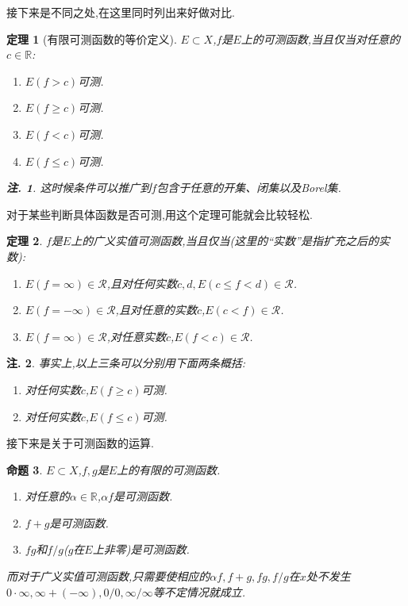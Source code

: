 \documentclass[12pt,a4paper,oneside]{ctexart}
\theoremstyle{nonumberplain}
\theoremstyle{plain}
\newtheorem{theorem}{定理}[section]
\theoremstyle{plain}
\theoremstyle{nonumberplain}
\newtheorem{remark}{注.}
\theoremstyle{plain}
\theoremstyle{plain}
\theoremstyle{plain}
\newtheorem{proposition}[theorem]{命题}
\theoremstyle{plain}
\newcommand{\R}{\mathbb{R}}
\newcommand{\cR}{\mathcal{R}}
\begin{document}
    接下来是不同之处,在这里同时列出来好做对比.
    \begin{theorem}[有限可测函数的等价定义]
        $E\subset X$,$f$是$E$上的可测函数,当且仅当对任意的$c\in \R$:
        \begin{enumerate}
            \item $E(f>c)$可测.
            \item $E(f\geqslant c)$可测.
            \item $E(f<c)$可测.
            \item $E(f\leqslant c)$可测.
        \end{enumerate}
        \begin{remark}
            这时候条件可以推广到$f$包含于任意的开集、闭集以及Borel集.
        \end{remark}
    \end{theorem}
    对于某些判断具体函数是否可测,用这个定理可能就会比较轻松.
    \begin{theorem}
        $f$是$E$上的广义实值可测函数,当且仅当(这里的``实数''是指扩充之后的实数):
        \begin{enumerate}
            \item $E(f=\infty)\in\cR$,且对任何实数$c,d,E(c\leqslant f<d)\in\cR$.
            \item $E(f=-\infty)\in\cR$,且对任意的实数$c$,$E(c<f)\in\cR$.
            \item $E(f=\infty)\in\cR$,对任意实数$c$,$E(f<c)\in\cR$.
        \end{enumerate}
    \end{theorem}
    \begin{remark}
        事实上,以上三条可以分别用下面两条概括:
        \begin{enumerate}
            \item 对任何实数$c$,$E(f\geqslant c)$可测.
            \item 对任何实数$c$,$E(f\leqslant c)$可测.
        \end{enumerate}
    \end{remark}
    接下来是关于可测函数的运算.
    \begin{proposition}
        $E\subset X$,$f,g$是$E$上的有限的可测函数.
        \begin{enumerate}
            \item 对任意的$\alpha\in\R$,$\alpha f$是可测函数.
            \item $f+g$是可测函数.
            \item $fg$和$f/g$($g$在$E$上非零)是可测函数.
        \end{enumerate}
        而对于广义实值可测函数,只需要使相应的$\alpha f,f+g,fg,f/g$在$x$处不发生$0\cdot \infty,\infty+(-\infty),0/0,\infty/\infty$等不定情况就成立.
    \end{proposition}
\end{document}
